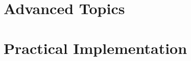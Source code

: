 \documentclass{kaobook}
\begin{document}
\part{Advanced Topics}






\part{Practical Implementation}




\appendix







\backmatter
\end{document}
